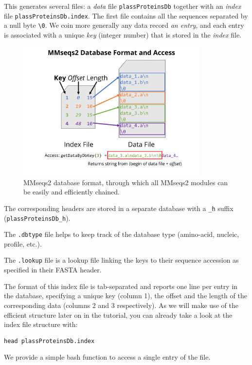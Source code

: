 \documentclass{scrartcl}
\begin{document}
This generates several files: a \textit{data} file \texttt{plassProteinsDb} together with an \textit{index} file \texttt{plassProteinsDb.index}. The first file contains all the sequences separated by a null byte \texttt{\textbackslash0}. We coin more generally any data record \textit{an entry}, and each entry is associated with a unique \textit{key} (integer number) that is stored in the \textit{index} file.

\begin{figure}[h!]
\centering
\includegraphics[height=70mm]{mmseqs-db-format}
\caption{MMseqs2 database format, through which all MMseqs2 modules can be easily and efficiently chained.}
\label{fig:dbformat}
\end{figure}

The corresponding headers are stored in a separate database with a \texttt{\_h} suffix (\texttt{plassProteinsDb\_h}).

The \texttt{.dbtype} file helps to keep track of the database type (amino-acid, nucleic, profile, etc.).

The \texttt{.lookup} file is a lookup file linking the keys to their sequence accession as specified in their FASTA header.

The format of this index file is tab-separated and reports one line per entry in the database, specifying a unique key (column 1), the offset and the length of the corresponding data (columns 2 and 3 respectively). As we will make use of the efficient structure later on in the tutorial, you can already take a look at the index file structure with:

\begin{verbatim}
head plassProteinsDb.index
\end{verbatim}

We provide a simple bash function to access a single entry of the file.
\end{document}
